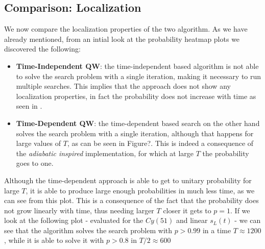     \clearpage
    \subsection{Comparison: Localization}\label{subsec:localization_results}
        We now compare the localization properties of the two algorithm. As we have already mentioned, from an intial look at the probability heatmap plots we discovered the following:
        \begin{itemize}
            \item \textbf{Time-Independent QW}: the time-independent based algorithm is not able to solve the search problem with a single iteration, making it necessary to run multiple searches. This implies that the approach does not show any localization properties, in fact the probability does not increase with time as seen in .
            \item \textbf{Time-Dependent QW}: the time-dependent based search on the other hand solves the search problem with a single iteration, although that happens for large values of $T$, as can be seen in Figure?. This is indeed a consequence of the \textit{adiabatic inspired} implementation, for which at large $T$ the probability goes to one.
        \end{itemize}
        

        \clearpage
        \noindent
        Although the time-dependent approach is able to get to unitary probability for large $T$, it is able to produce large enough probabilities in much less time, as we can see from this plot. This is a consequence of the fact that the probability does not grow linearly with time, thus needing larger $T$ closer it gets to $p=1$. If we look at the following plot - evaluated for the $Cy(51)$ and linear $s_L(t)$ - we can see that the algorithm solves the search problem with $p>0.99$ in a time $T\approx 1200$, while it is able to solve it with $p>0.8$ in $T/2 \approx 600$
        

        \clearpage
